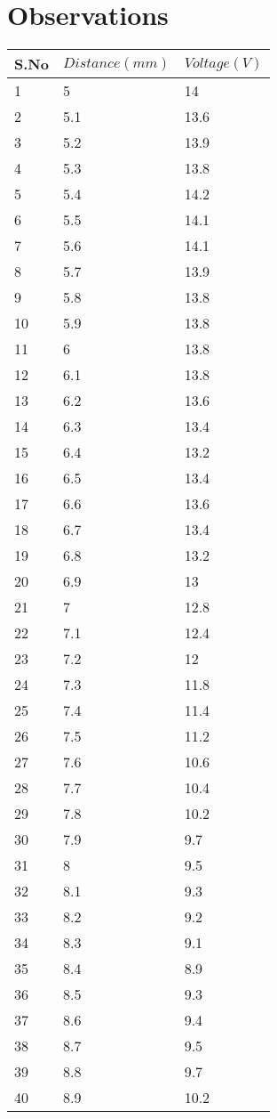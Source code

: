 \documentclass[
	letterpaper, %
	10pt, %
]{CSUniSchoolLabReport}
\begin{document}
\section{Observations}
\begin{center}
	\begin{tabular}{ | m{1cm} | m{3cm}| m{3cm} | } 
		\hline
		S.No	&	\(Distance (mm)\)	&	\(Voltage (V)\) \\
		\hline
		1&5&14\\
2&5.1&13.6\\
3&5.2&13.9\\
4&5.3&13.8\\
5&5.4&14.2\\
6&5.5&14.1\\
7&5.6&14.1\\
8&5.7&13.9\\
9&5.8&13.8\\
10&5.9&13.8\\
11&6&13.8\\
12&6.1&13.8\\
13&6.2&13.6\\
14&6.3&13.4\\
15&6.4&13.2\\
16&6.5&13.4\\
17&6.6&13.6\\
18&6.7&13.4\\
19&6.8&13.2\\
20&6.9&13\\
21&7&12.8\\
22&7.1&12.4\\
23&7.2&12\\
24&7.3&11.8\\
25&7.4&11.4\\
26&7.5&11.2\\
27&7.6&10.6\\
28&7.7&10.4\\
29&7.8&10.2\\
30&7.9&9.7\\
31&8&9.5\\
32&8.1&9.3\\
33&8.2&9.2\\
34&8.3&9.1\\
35&8.4&8.9\\
36&8.5&9.3\\
37&8.6&9.4\\
38&8.7&9.5\\
39&8.8&9.7\\
40&8.9&10.2\\
\hline
	\end{tabular}
\end{center}
\end{document}
